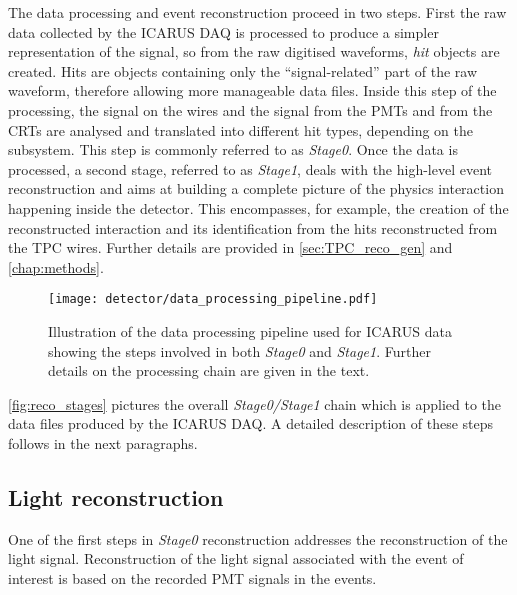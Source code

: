 The data processing and event reconstruction proceed in two steps. First the raw data collected by the ICARUS DAQ is processed to produce a simpler representation of the signal, so from the raw digitised waveforms, \emph{hit} objects are created. Hits are objects containing only the ``signal-related'' part of the raw waveform, therefore allowing more manageable data files. Inside this step of the processing, the signal on the wires and the signal from the PMTs and from the CRTs are analysed and translated into different hit types, depending on the subsystem. This step is commonly referred to as \emph{Stage0}. Once the data is processed, a second stage, referred to as \emph{Stage1}, deals with the high-level event reconstruction and aims at building a complete picture of the physics interaction happening inside the detector. This encompasses, for example, the creation of the reconstructed interaction and its identification from the hits reconstructed from the TPC wires. Further details are provided in \autoref{sec:TPC_reco_gen} and \autoref{chap:methods}. 

\begin{figure}
    \centering
    \texttt{[image: detector/data\_processing\_pipeline.pdf]}
    \caption[\emph{Stage0} and \emph{Stage1} data processing pipeline]{Illustration of the data processing pipeline used for ICARUS data showing the steps involved in both \emph{Stage0} and \emph{Stage1}. Further details on the processing chain are given in the text. }
    \label{fig:reco_stages}
\end{figure}

\autoref{fig:reco_stages} pictures the overall \emph{Stage0/Stage1} chain which is applied to the data files produced by the ICARUS DAQ. A detailed description of these steps follows in the next paragraphs. 

\subsection{Light reconstruction}

One of the first steps in \emph{Stage0} reconstruction addresses the reconstruction of the light signal. Reconstruction of the light signal associated with the event of interest is based on the recorded PMT signals in the events.

